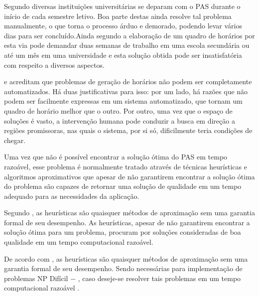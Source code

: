 Segundo \cite{marinho} diversas instituições universitárias se deparam com o PAS durante o início de cada semestre letivo. Boa parte destas ainda resolve tal problema manualmente, o que torna o processo árduo e demorado, podendo levar vários dias para ser concluído.Ainda segundo \cite{souza} a elaboração de um quadro de horários por esta via pode demandar duas semanas de trabalho em uma escola secundária ou até um mês em uma universidade e esta solução obtida pode ser insatisfatória com respeito a diversos aspectos.\par


\cite{Schaerf (1999)} e \cite{Werra (1985)} acreditam que problemas de geração de horários não podem ser completamente automatizados. Há duas justificativas para isso: por um lado, há razões que não podem ser facilmente expressas em um sistema automatizado, que tornam um quadro de horário melhor que o outro. Por outro, uma vez que o espaço de soluções é vasto, a intervenção humana pode conduzir a busca em direção a regiões promissoras, nas quais o sistema, por si só, dificilmente teria condições de chegar.\par

Uma vez que não é possível encontrar a solução ótima do PAS em tempo razoável, esse problema é normalmente tratado através de técnicas heurísticas e algoritmos aproximativos que apesar de não garantirem encontrar a solução ótima do problema são capazes de retornar uma solução de qualidade em um tempo adequado para as necessidades da aplicação.\par




Segundo \cite{Papadimitriou & Steiglitz (1982)}, as heurísticas são quaisquer métodos de 
aproximação sem uma garantia formal de seu desempenho. As heurísticas, apesar de não garantirem encontrar a solução ótima para um problema, procuram por soluções consideradas de boa qualidade em um tempo computacional razoável.\par

De acordo com \cite{P APADIMITRIOU & S TEIGLITZ (1982)}, as heurísticas são quaisquer métodos de aproximação sem uma garantia formal de seu desempenho. Sendo necessárias para implementação de problemas NP Difícil − , caso deseje-se resolver tais problemas em um tempo computacional razoável \cite{(E VANS & M INIEKA , 1978)}.\par

